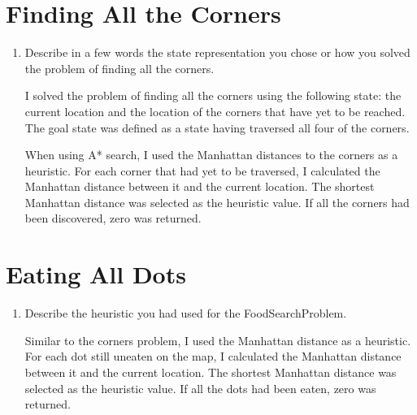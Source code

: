 \documentclass[fleqn]{hermans-hw}
\begin{document}
\section{Finding All the Corners}
\begin{enumerate}
	\item Describe in a few words the state representation you chose or how you solved the problem of finding all the corners.
	
	I solved the problem of finding all the corners using the following state: the current location and the location of the corners that have yet to be reached. The goal state was defined as a state having traversed all four of the corners.
	
	When using A* search, I used the Manhattan distances to the corners as a heuristic. For each corner that had yet to be traversed, I calculated the Manhattan distance between it and the current location. The shortest Manhattan distance was selected as the heuristic value. If all the corners had been discovered, zero was returned.
\end{enumerate}

\section{Eating All Dots}
\begin{enumerate}
	\item Describe the heuristic you had used for the FoodSearchProblem.
	
	Similar to the corners problem, I used the Manhattan distance as a heuristic. For each dot still uneaten on the map, I calculated the Manhattan distance between it and the current location. The shortest Manhattan distance was selected as the heuristic value. If all the dots had been eaten, zero was returned.
\end{enumerate}

\newpage
\end{document}
